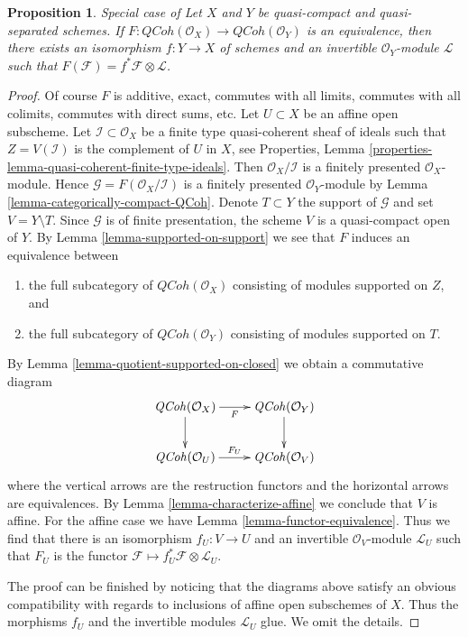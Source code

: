 \documentclass{stacks-project}
\newenvironment{reference}{\comment}{\endcomment}
\theoremstyle{plain}
\newtheorem{proposition}[subsection]{Proposition}
\theoremstyle{definition}
\theoremstyle{remark}
\numberwithin{equation}{subsection}
\def\QCoh{\mathit{QCoh}}
\begin{document}
\begin{proposition}
\label{proposition-gabriel-rosenberg}
\begin{reference}
Special case of \cite[Theorem 1.2]{Brandenburg}
\end{reference}
Let $X$ and $Y$ be quasi-compact and quasi-separated schemes.
If $F : \QCoh(\mathcal{O}_X) \to \QCoh(\mathcal{O}_Y)$
is an equivalence, then there exists an isomorphism
$f : Y \to X$ of schemes and an invertible $\mathcal{O}_Y$-module
$\mathcal{L}$ such that $F(\mathcal{F}) = f^*\mathcal{F} \otimes \mathcal{L}$.
\end{proposition}

\begin{proof}
Of course $F$ is additive, exact, commutes with all limits,
commutes with all colimits, commutes with direct sums, etc.
Let $U \subset X$ be an affine open subscheme.
Let $\mathcal{I} \subset \mathcal{O}_X$ be a finite type
quasi-coherent sheaf of ideals such that $Z = V(\mathcal{I})$
is the complement of $U$ in $X$, see
Properties, Lemma \ref{properties-lemma-quasi-coherent-finite-type-ideals}.
Then $\mathcal{O}_X/\mathcal{I}$ is a finitely presented
$\mathcal{O}_X$-module. Hence $\mathcal{G} = F(\mathcal{O}_X/\mathcal{I})$
is a finitely presented $\mathcal{O}_Y$-module by
Lemma \ref{lemma-categorically-compact-QCoh}.
Denote $T \subset Y$ the support of $\mathcal{G}$ and set
$V = Y \setminus T$. Since $\mathcal{G}$ is of finite presentation,
the scheme $V$ is a quasi-compact open of $Y$.
By Lemma \ref{lemma-supported-on-support} we see that $F$ induces an
equivalence between
\begin{enumerate}
\item the full subcategory of $\QCoh(\mathcal{O}_X)$ consisting
of modules supported on $Z$, and
\item the full subcategory of $\QCoh(\mathcal{O}_Y)$ consisting
of modules supported on $T$.
\end{enumerate}
By Lemma \ref{lemma-quotient-supported-on-closed} we obtain a commutative
diagram
$$
\xymatrix{
\QCoh(\mathcal{O}_X) \ar[r]_F \ar[d] &
\QCoh(\mathcal{O}_Y) \ar[d] \\
\QCoh(\mathcal{O}_U) \ar[r]^{F_U} &
\QCoh(\mathcal{O}_V)
}
$$
where the vertical arrows are the restruction functors and the
horizontal arrows are equivalences. By Lemma \ref{lemma-characterize-affine}
we conclude that $V$ is affine. For the affine case we have
Lemma \ref{lemma-functor-equivalence}. Thus we find that there
is an isomorphism $f_U : V \to U$ and an invertible
$\mathcal{O}_V$-module $\mathcal{L}_U$ such that
$F_U$ is the functor
$\mathcal{F} \mapsto f_U^*\mathcal{F} \otimes \mathcal{L}_U$.

\medskip\noindent
The proof can be finished by noticing that the diagrams above
satisfy an obvious compatibility with regards to inclusions
of affine open subschemes of $X$. Thus the morphisms $f_U$ and the
invertible modules $\mathcal{L}_U$ glue. We omit the details.
\end{proof}
\end{document}

